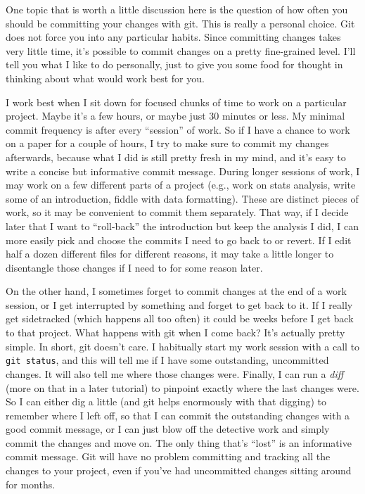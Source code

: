 \documentclass{article}
\begin{document}
One topic that is worth a little discussion here is the question of how often you should be committing your changes with git. This is really a personal choice.  Git does not force you into any particular habits.  Since committing changes takes very little time, it's possible to commit changes on a pretty fine-grained level.  I'll tell you what I like to do personally, just to give you some food for thought in thinking about what would work best for you.

I work best when I sit down for focused chunks of time to work on a particular project.  Maybe it's a few hours, or maybe just 30 minutes or less.  My minimal commit frequency is after every ``session'' of work.  So if I have a chance to work on a paper for a couple of hours, I try to make sure to commit my changes afterwards, because what I did is still pretty fresh in my mind, and it's easy to write a concise but informative commit message.  During longer sessions of work, I may work on a few different parts of a project (e.g., work on stats analysis, write some of an introduction, fiddle with data formatting).  These are distinct pieces of work, so it may be convenient to commit them separately. That way, if I decide later that I want to ``roll-back'' the introduction but keep the analysis I did, I can more easily pick and choose the commits I need to go back to or revert.  If I edit half a dozen different files for different reasons, it may take a little longer to disentangle those changes if I need to for some reason later.

On the other hand, I sometimes forget to commit changes at the end of a work session, or I get interrupted by something and forget to get back to it.  If I really get sidetracked (which happens all too often) it could be weeks before I get back to that project.  What happens with git when I come back?  It's actually pretty simple.  In short, git doesn't care.  I habitually start my work session with a call to \texttt{git status}, and this will tell me if I have some outstanding, uncommitted changes.  It will also tell me where those changes were.  Finally, I can run a \emph{diff} (more on that in a later tutorial) to pinpoint exactly where the last changes were.  So I can either dig a little (and git helps enormously with that digging) to remember where I left off, so that I can commit the outstanding changes with a good commit message, or I can just blow off the detective work and simply commit the changes and move on.  The only thing that's ``lost'' is an informative commit message.  Git will have no problem committing and tracking all the changes to your project, even if you've had uncommitted changes sitting around for months.
\end{document}
